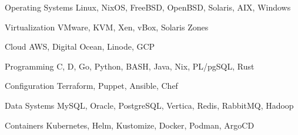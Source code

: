


\begin{cvskills}


\cvskill
{Operating Systems} %
{Linux, NixOS, FreeBSD, OpenBSD, Solaris, AIX, Windows} %


\cvskill
{Virtualization} %
{VMware, KVM, Xen, vBox, Solaris Zones} %

\cvskill
{Cloud} %
{AWS, Digital Ocean, Linode, GCP} %


\cvskill
{Programming} %
{C, D, Go, Python, BASH, Java, Nix, PL/pgSQL, Rust} %

\cvskill
{Configuration} %
{Terraform, Puppet, Ansible, Chef} %

\cvskill
{Data Systems} %
{MySQL, Oracle, PostgreSQL, Vertica, Redis, RabbitMQ, Hadoop} %

\cvskill
{Containers} %
{Kubernetes, Helm, Kustomize, Docker, Podman, ArgoCD} %


\end{cvskills}
